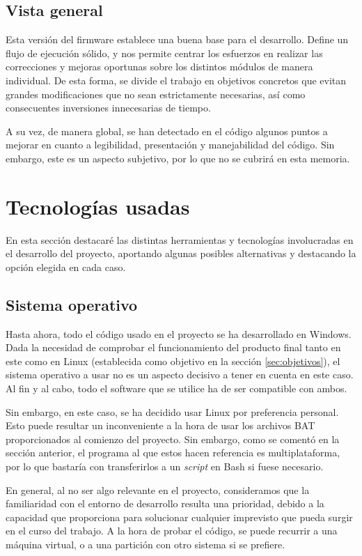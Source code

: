 \subsection{Vista general}

Esta versión del firmware establece una buena base para el desarrollo. Define un flujo de ejecución sólido, y nos permite centrar los esfuerzos en realizar las correcciones y mejoras oportunas sobre los distintos módulos de manera individual. De esta forma, se divide el trabajo en objetivos concretos que evitan grandes modificaciones que no sean estrictamente necesarias, así como consecuentes inversiones innecesarias de tiempo.

A su vez, de manera global, se han detectado en el código algunos puntos a mejorar en cuanto a legibilidad, presentación y manejabilidad del código. Sin embargo, este es un aspecto subjetivo, por lo que no se cubrirá en esta memoria.

\section{Tecnologías usadas}

En esta sección destacaré las distintas herramientas y tecnologías involucradas en el desarrollo del proyecto, aportando algunas posibles alternativas y destacando la opción elegida en cada caso.

\subsection{Sistema operativo}

Hasta ahora, todo el código usado en el proyecto se ha desarrollado en Windows. Dada la necesidad de comprobar el funcionamiento del producto final tanto en este como en Linux (establecida como objetivo en la sección \ref{sec:objetivos}), el sistema operativo a usar no es un aspecto decisivo a tener en cuenta en este caso. Al fin y al cabo, todo el software que se utilice ha de ser compatible con ambos.

Sin embargo, en este caso, se ha decidido usar Linux por preferencia personal. Esto puede resultar un inconveniente a la hora de usar los archivos BAT proporcionados al comienzo del proyecto. Sin embargo, como se comentó en la sección anterior, el programa al que estos hacen referencia es multiplataforma, por lo que bastaría con transferirlos a un \textit{script} en Bash si fuese necesario.

En general, al no ser algo relevante en el proyecto, consideramos que la familiaridad con el entorno de desarrollo resulta una prioridad, debido a la capacidad que proporciona para solucionar cualquier imprevisto que pueda surgir en el curso del trabajo. A la hora de probar el código, se puede recurrir a una máquina virtual, o a una partición con otro sistema si se prefiere.


